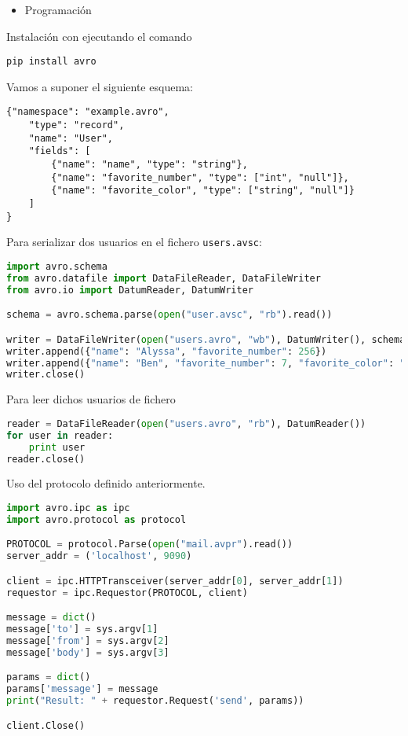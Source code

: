 \begin{itemize}[label=\color{red}\textbullet, leftmargin=*]
	\item \color{lightblue}Programación
\end{itemize}

Instalación con ejecutando el comando
\begin{lstlisting}
pip install avro
\end{lstlisting}
Vamos a suponer el siguiente esquema:
\pagebreak
\begin{lstlisting}
{"namespace": "example.avro",
	"type": "record",
	"name": "User",
	"fields": [
		{"name": "name", "type": "string"},
		{"name": "favorite_number", "type": ["int", "null"]},
		{"name": "favorite_color", "type": ["string", "null"]}
	]
}
\end{lstlisting}

Para serializar dos usuarios en el fichero \texttt{users.avsc}:

\begin{lstlisting}[language=python]
import avro.schema
from avro.datafile import DataFileReader, DataFileWriter
from avro.io import DatumReader, DatumWriter

schema = avro.schema.parse(open("user.avsc", "rb").read())

writer = DataFileWriter(open("users.avro", "wb"), DatumWriter(), schema)
writer.append({"name": "Alyssa", "favorite_number": 256})
writer.append({"name": "Ben", "favorite_number": 7, "favorite_color": "red"})
writer.close()
\end{lstlisting}

Para leer dichos usuarios de fichero
\begin{lstlisting}[language=python]
reader = DataFileReader(open("users.avro", "rb"), DatumReader())
for user in reader:
	print user
reader.close()
\end{lstlisting}

Uso del protocolo definido anteriormente.
\begin{lstlisting}[language=python]
import avro.ipc as ipc
import avro.protocol as protocol

PROTOCOL = protocol.Parse(open("mail.avpr").read())
server_addr = ('localhost', 9090)

client = ipc.HTTPTransceiver(server_addr[0], server_addr[1])
requestor = ipc.Requestor(PROTOCOL, client)

message = dict()
message['to'] = sys.argv[1]
message['from'] = sys.argv[2]
message['body'] = sys.argv[3]

params = dict()
params['message'] = message
print("Result: " + requestor.Request('send', params))

client.Close()
\end{lstlisting}
